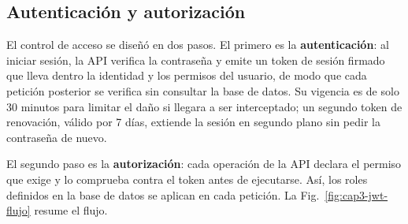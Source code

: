 \subsection{Autenticación y autorización}

El control de acceso se diseñó en dos pasos. El primero es la \textbf{autenticación}: al iniciar sesión, la API verifica la contraseña y emite un token de sesión firmado que lleva dentro la identidad y los permisos del usuario, de modo que cada petición posterior se verifica sin consultar la base de datos. Su vigencia es de solo 30 minutos para limitar el daño si llegara a ser interceptado; un segundo token de renovación, válido por 7 días, extiende la sesión en segundo plano sin pedir la contraseña de nuevo.

El segundo paso es la \textbf{autorización}: cada operación de la API declara el permiso que exige y lo comprueba contra el token antes de ejecutarse. Así, los roles definidos en la base de datos se aplican en cada petición. La Fig.~\ref{fig:cap3-jwt-flujo} resume el flujo.

